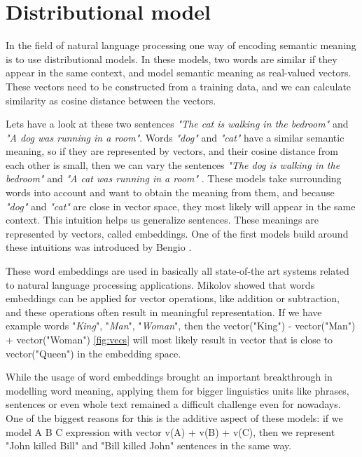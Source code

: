 \section{Distributional model}
In the field of natural language processing one way of encoding semantic meaning is to use distributional models. In these models, two words are similar if they appear in the same context, and model semantic meaning as real-valued vectors. These vectors need to be constructed from a training data, and we can calculate similarity as cosine distance between the vectors.

Lets have a look at these two sentences \textit{"The cat is walking in the bedroom"} and \textit{"A dog was running in a room"}. Words \textit{"dog"} and \textit{"cat"} have a similar semantic meaning, so if they are represented by vectors, and their cosine distance from each other is small, then we can vary the sentences \textit{"The dog is walking in the bedroom"} and \textit{"A cat was running in a room"} \cite{Bengio:2003}. These models take surrounding words into account and want to obtain the meaning from them\cite{Jurafsky:2018}, and because \textit{"dog"} and \textit{"cat"} are close in vector space, they most likely will appear in the same context. This intuition helps us generalize sentences. These meanings are represented by vectors, called embeddings. One of the first models build around these intuitions was introduced by Bengio \cite{Bengio:2003}. 

These word embeddings are used in basically all state-of-the art systems related to natural language processing applications. Mikolov \cite{Mikolov:2013c} showed that words embeddings can be applied for vector operations, like addition or subtraction, and these operations often result in meaningful representation. If we have example words "\textit{King}", "\textit{Man}", "\textit{Woman}", then the vector("King") - vector("Man") + vector("Woman") \ref{fig:vecs} will most likely result in vector that is close to vector("Queen") in the embedding space.

 While the usage of word embeddings brought an important breakthrough in modelling word meaning, applying them for bigger linguistics units like phrases, sentences or even whole text remained a difficult challenge even for nowadays. One of the biggest reasons for this is the additive aspect of these models: if we model A B C expression with vector v(A) + v(B) + v(C), then we represent "John killed Bill" and "Bill killed John" sentences in the same way. 

